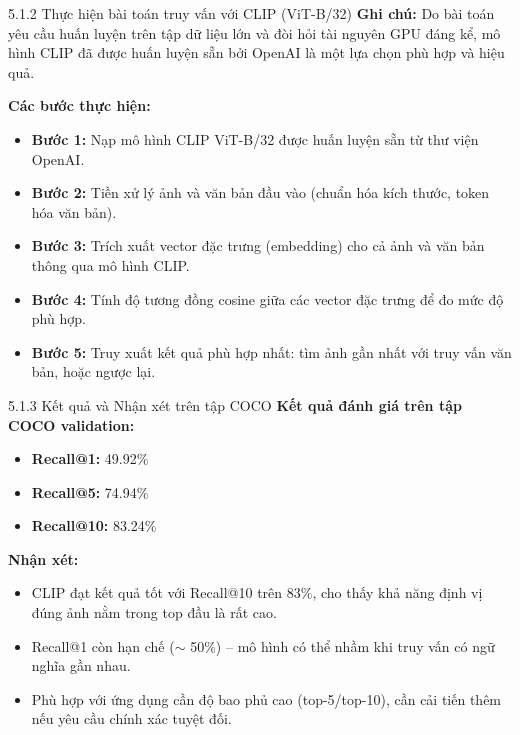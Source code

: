 \begin{frame}{5.1.2 Thực hiện bài toán truy vấn với CLIP (ViT-B/32)}
\textbf{Ghi chú:} Do bài toán yêu cầu huấn luyện trên tập dữ liệu lớn và đòi hỏi tài nguyên GPU đáng kể, mô hình CLIP đã được huấn luyện sẵn bởi OpenAI là một lựa chọn phù hợp và hiệu quả.

\vspace{1em}
\textbf{Các bước thực hiện:}
\begin{itemize}
    \item \textbf{Bước 1:} Nạp mô hình CLIP ViT-B/32 được huấn luyện sẵn từ thư viện OpenAI.
    \item \textbf{Bước 2:} Tiền xử lý ảnh và văn bản đầu vào (chuẩn hóa kích thước, token hóa văn bản).
    \item \textbf{Bước 3:} Trích xuất vector đặc trưng (embedding) cho cả ảnh và văn bản thông qua mô hình CLIP.
    \item \textbf{Bước 4:} Tính độ tương đồng cosine giữa các vector đặc trưng để đo mức độ phù hợp.
    \item \textbf{Bước 5:} Truy xuất kết quả phù hợp nhất: tìm ảnh gần nhất với truy vấn văn bản, hoặc ngược lại.
\end{itemize}
\end{frame}

\begin{frame}{5.1.3 Kết quả và Nhận xét trên tập COCO}
\textbf{Kết quả đánh giá trên tập COCO validation:}
\begin{itemize}
    \item \textbf{Recall@1:} 49.92\%
    \item \textbf{Recall@5:} 74.94\%
    \item \textbf{Recall@10:} 83.24\%

\end{itemize}

\vspace{0.5em}
\textbf{Nhận xét:}
\begin{itemize}
    \item CLIP đạt kết quả tốt với Recall@10 trên 83\%, cho thấy khả năng định vị đúng ảnh nằm trong top đầu là rất cao.
    \item Recall@1 còn hạn chế ($\sim$ 50\%) – mô hình có thể nhầm khi truy vấn có ngữ nghĩa gần nhau.
    \item Phù hợp với ứng dụng cần độ bao phủ cao (top-5/top-10), cần cải tiến thêm nếu yêu cầu chính xác tuyệt đối.
\end{itemize}
\end{frame}

